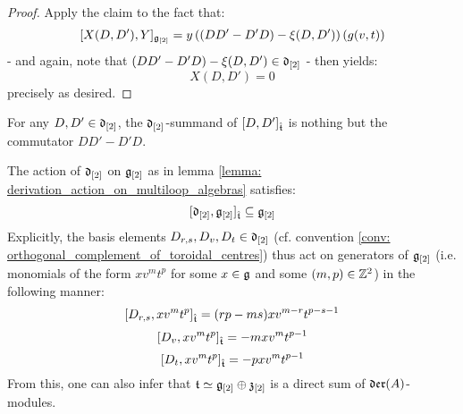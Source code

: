 \begin{proof}
                Apply the claim to the fact that:
                    $$[X(D, D'), Y]_{\mathfrak{g}_{[2]}} = y \left( ( DD' - D'D) - \xi(D, D') \right)( g(v, t) )$$
                - and again, note that $( DD' - D'D) - \xi(D, D') \in \mathfrak{d}_{[2]}$ - then yields:
                    $$X(D, D') = 0$$
                precisely as desired. 
            \end{proof}
        \begin{corollary}
            For any $D, D' \in \mathfrak{d}_{[2]}$, the $\mathfrak{d}_{[2]}$-summand of $[D, D']_{\hat{\mathfrak{t}}}$ is nothing but the commutator $DD' - D'D$.
        \end{corollary} 
        \begin{corollary} \label{coro: derivation_action_on_multiloop_algebras}
            The action of $\mathfrak{d}_{[2]}$ on $\mathfrak{g}_{[2]}$ as in lemma \ref{lemma: derivation_action_on_multiloop_algebras} satisfies:
                $$[\mathfrak{d}_{[2]}, \mathfrak{g}_{[2]}]_{\hat{\mathfrak{t}}} \subseteq \mathfrak{g}_{[2]}$$
            Explicitly, the basis elements $D_{r, s}, D_v, D_t \in \mathfrak{d}_{[2]}$ (cf. convention \ref{conv: orthogonal_complement_of_toroidal_centres}) thus act on generators of $\mathfrak{g}_{[2]}$ (i.e. monomials of the form $x v^m t^p$ for some $x \in \mathfrak{g}$ and some $(m, p) \in \mathbb{Z}^2$) in the following manner:
                $$[D_{r, s}, x v^m t^p]_{\hat{\mathfrak{t}}} = (rp - ms) x v^{m - r} t^{p - s - 1}$$
                $$[D_v, x v^m t^p]_{\hat{\mathfrak{t}}} = -m x v^m t^{p - 1}$$
                $$[D_t, x v^m t^p]_{\hat{\mathfrak{t}}} = -p x v^m t^{p - 1}$$
            From this, one can also infer that $\mathfrak{t} \simeq \mathfrak{g}_{[2]} \oplus \mathfrak{z}_{[2]}$ is a direct sum of $\mathfrak{der}(A)$-modules.
        \end{corollary}
